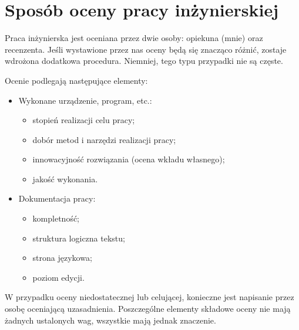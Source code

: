 \chapter{Sposób oceny pracy inżynierskiej}
\label{chap:review}

Praca inżynierska jest oceniana przez dwie osoby: opiekuna (mnie) oraz recenzenta. Jeśli wystawione przez nas oceny będą się znacząco różnić, zostaje wdrożona dodatkowa procedura. Niemniej, tego typu przypadki nie są częste.

Ocenie podlegają następujące elementy:
\begin{itemize}
    \item Wykonane urządzenie, program, etc.:
    \begin{itemize}
        \item stopień realizacji celu pracy;
        \item dobór metod i narzędzi realizacji pracy;
        \item innowacyjność rozwiązania (ocena wkładu własnego);
        \item jakość wykonania.
    \end{itemize}
    \item Dokumentacja pracy:
    \begin{itemize}
        \item kompletność;
        \item struktura logiczna tekstu;
        \item strona językowa;
        \item poziom edycji.
    \end{itemize}
\end{itemize}
W przypadku oceny niedostatecznej lub celującej, konieczne jest napisanie przez osobę oceniającą uzasadnienia. Poszczególne elementy składowe oceny nie mają żadnych ustalonych wag, wszystkie mają jednak znaczenie.